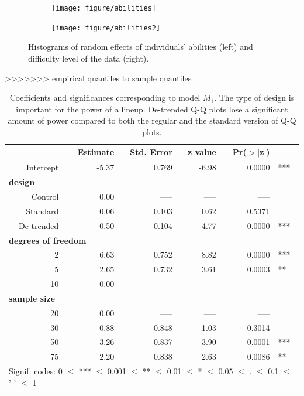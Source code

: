 \documentclass{article}\usepackage[]{graphicx}\usepackage[]{color}
\newenvironment{knitrout}{}{} %
\begin{document}
\begin{figure}
\begin{subfigure}[b]{0.5\textwidth}
\begin{knitrout}
\color{fgcolor}
\texttt{[image: figure/abilities]} 

\end{knitrout}

\end{subfigure}
\begin{subfigure}[b]{0.5\textwidth}
\begin{knitrout}
\color{fgcolor}
\texttt{[image: figure/abilities2]} 

\end{knitrout}

\end{subfigure}
\caption{\label{fig:ranef}Histograms of random effects of individuals' abilities (left) and difficulty level of the data (right). }
\end{figure}
>>>>>>> empirical quantiles to sample quantiles

\begin{table}[ht]
\centering
\caption{\label{tab:model} Coefficients and significances corresponding to  model $M_1$. The type of design is important for the power of a lineup. De-trended Q-Q plots lose a significant amount of power compared to both the regular and the standard version of Q-Q plots. }
\begin{tabular}{rrrrrl}
  \hline
 &\bf Estimate &\bf Std. Error &\bf z value &\bf Pr($>$$|$z$|$) & \\ 
  \hline
  Intercept &  -5.37 & 0.769 & -6.98 & 0.0000  & *** \\ [3pt]
\multicolumn{3}{l}{\bf design} \\
   Control & 0.00 & ----- & ----- & ----- \\ 
   Standard & 0.06 & 0.103 & 0.62 & 0.5371 \\
   De-trended & -0.50 & 0.104 & -4.77 & 0.0000 & ***\\  [3pt]
\multicolumn{4}{l}{\bf degrees of freedom} \\
  2 & 6.63 & 0.752 & 8.82 & 0.0000 & ***\\ 
  5 & 2.65 & 0.732 & 3.61 & 0.0003 & **\\ 
  10 & 0.00 & ----- & ----- & ----- \\ [3pt]
\multicolumn{3}{l}{\bf sample size} \\
  20 & 0.00 & ----- & ----- & ----- \\ 
  30 & 0.88 & 0.848 & 1.03 & 0.3014 \\ 
  50  & 3.26 & 0.837 & 3.90 & 0.0001 & ***\\ 
  75 & 2.20 & 0.838 & 2.63 & 0.0086  & **\\ 
   \hline
\multicolumn{6}{l}{Signif. codes:  0 $\le$ *** $\le$ 0.001 $\le$ ** $\le$ 0.01 $\le$ * $\le$ 0.05 $\le$ . $\le$ 0.1 $\le$ ' ' $\le$ 1}
\end{tabular}
\end{table}
\end{document}
